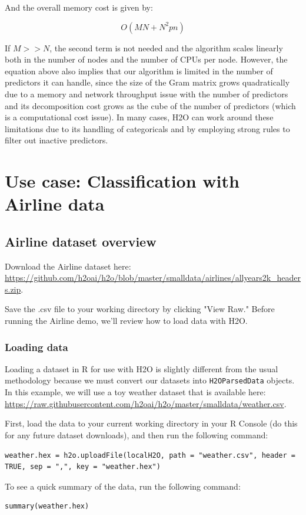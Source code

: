 \documentclass{article}[11pt]
\begin{document}
And the overall memory cost is given by:

\[ O(MN + N^2pn)\]

If $M >> N$, the second term is not needed and the algorithm scales linearly both in the number of nodes and the number of CPUs per node. However, the equation above also implies that our algorithm is limited in the number of predictors it can handle, since the size of the Gram matrix grows quadratically due to a memory and network throughput issue with the number of predictors and its decomposition cost grows as the cube of the number of predictors (which is a computational cost issue). In many cases, H2O can work around these limitations due to its handling of categoricals and by employing strong rules to filter out inactive predictors.  


\section{Use case: Classification with Airline data}


\subsection{Airline dataset overview} 

Download the Airline dataset here: {\url{https://github.com/h2oai/h2o/blob/master/smalldata/airlines/allyears2k_headers.zip}}.

Save the .csv file to your working directory by clicking  "View Raw."  Before running the Airline demo, we'll review how to load data with H2O. 

\subsubsection{Loading data} \label{2.5}

Loading a dataset in R for use with H2O is slightly different from the usual methodology because we must convert our datasets into \texttt{H2OParsedData} objects. In this example, we will use a toy weather dataset that is available here: {\url{https://raw.githubusercontent.com/h2oai/h2o/master/smalldata/weather.csv}}. 

First, load the data to your current working directory in your R Console (do this for any future dataset downloads), and then run the following command:
\begin{lstlisting}[breaklines,basicstyle=\ttfamily]
weather.hex = h2o.uploadFile(localH2O, path = "weather.csv", header = TRUE, sep = ",", key = "weather.hex")
\end{lstlisting}
\bigskip
\noindent
To see a quick summary of the data, run the following command:
\begin{lstlisting}[breaklines,basicstyle=\ttfamily]
summary(weather.hex)
\end{lstlisting}
\end{document}
